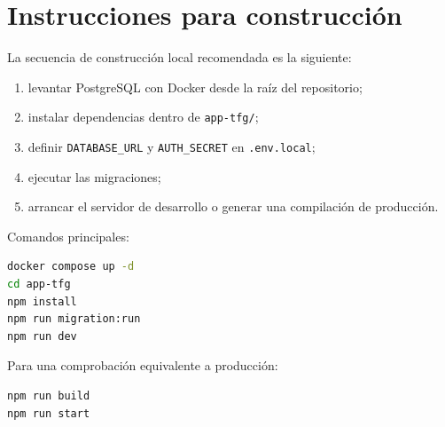 \section{Instrucciones para construcción}

La secuencia de construcción local recomendada es la siguiente:

\begin{enumerate}
    \item levantar PostgreSQL con Docker desde la raíz del repositorio;
    \item instalar dependencias dentro de \texttt{app-tfg/};
    \item definir \texttt{DATABASE\_URL} y \texttt{AUTH\_SECRET} en \texttt{.env.local};
    \item ejecutar las migraciones;
    \item arrancar el servidor de desarrollo o generar una compilación de producción.
\end{enumerate}

Comandos principales:

\begin{lstlisting}[language=bash]
docker compose up -d
cd app-tfg
npm install
npm run migration:run
npm run dev
\end{lstlisting}

Para una comprobación equivalente a producción:

\begin{lstlisting}[language=bash]
npm run build
npm run start
\end{lstlisting}
